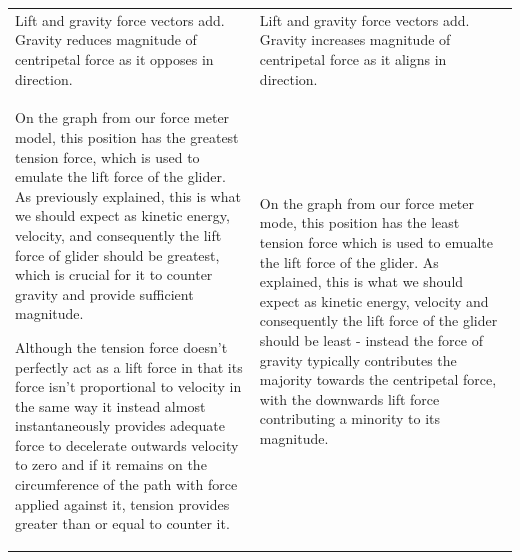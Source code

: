 \documentclass[11pt, a4paper]{article}
\begin{document}
\begin{table}[H]
\begin{tabularx}{\textwidth}{|>{\raggedright\arraybackslash}X|||>{\raggedright\arraybackslash}X|}
{				\begin{align}
					\vec{F_c} &= \vec{F_L} + \vec{F_g} \\
					|\vec{F_c}| &= |\vec{F_L}| + |\vec{F_g}|
				\end{align}
			}\\
			\hline
			Lift and gravity force vectors add. Gravity reduces magnitude of centripetal force as it opposes in direction.
			&
			Lift and gravity force vectors add. Gravity increases magnitude of centripetal force as it aligns in direction.\\
			\hline
			On the graph from our force meter model, this position has the greatest tension force, which is used to emulate the lift force of the glider. As previously explained, this is what we should expect as kinetic energy, velocity, and consequently the lift force of glider should be greatest, which is crucial for it to counter gravity and provide sufficient magnitude.
			
			\vspace{\baselineskip}
			Although the tension force doesn't perfectly act as a lift force in that its force isn't proportional to velocity in the same way it instead almost instantaneously provides adequate force to decelerate outwards velocity to zero and if it remains on the circumference of the path with force applied against it, tension provides greater than or equal to counter it.
			&
			On the graph from our force meter mode, this position has the least tension force which is used to emualte the lift force of the glider. As explained, this is what we should expect as kinetic energy, velocity and consequently the lift force of the glider should be least - instead the force of gravity typically contributes the majority towards the centripetal force, with the downwards lift force contributing a minority to its magnitude.\\
			\hline
		\end{tabularx}
	\end{table}
	
\end{document}
